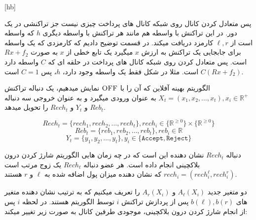 [hb]

پس متعادل کردن کانال روی شبکه کانال های پرداخت چیزی نیست جز تراکنشی در یک دور. در این تراکنش با واسطه هم مانند هر تراکنش با واسطه دیگری $h$ که واسطه است از
$\ell , r$
کارمزد دریافت میکند. در قسمت  توضیح دادیم که کارمزدی که یک واسطه برای جابجایی یک تراکنش به ارزش $x$ میگیرد یک تابع خطی از $x$ به صورت
$Rx+f_2$
است. پس متعادل کردن روی شبکه کانال های پرداخت در حلقه ای که $C$ واسطه دارد
$C(Rx+f_2)$
است. مثلا در شکل  فقط یک واسطه وجود دارد، $h$، پس
$C=1$
است.






الگوریتم بهینه آفلاین که آن را با $\textsc{OFF}$ نمایش میدهیم، یک دنباله تراکنش $X_t=(x_1,x_2,\dots,x_t), x_i \in \mathbb{R}^+$ به عنوان ورودی میگیرد و به عنوان خروجی سه دنباله $Reb_t$ و  $Y_t$ و $Rech_t$ را تحویل میدهد. 

$$Rech_t=\{rech_1,rech_2,\dots,rech_t\}, rech_i \in  \{\mathbb{R}^{\geq 0}\} \times \{\mathbb{R}^{\geq 0}\}$$
$$Reb_t=\{reb_1,reb_2,\dots,reb_t\}, reb_i \in  \mathbb{R}$$
$$Y_t=\{y_1,y_2,\dots,y_t\}, y_i \in \{\texttt{Accept},\texttt{Reject}\}$$


دنباله $Rech_t$ نشان دهنده این است که در چه زمان هایی الگوریتم  \off شارژ کردن درون بلاکچینی انجام داده است. هر عضو دنباله $Rech_t$ یک زوج مرتب است 
$rech_i = (rech^{\ell}_i,rech^{r}_i)$
که نشان دهنده میزان پول اضافه شده به $\ell$ و $r$ هستند.

 دو متغیر جدید
 $A_{\ell}(X_i)$ و $A_{r}(X_i)$
را تعریف میکنیم که به ترتیب نشان دهنده متغیر های 
$b(\ell) , b(r)$
 پس از پردازش تراکنش $i$ توسط الگوریتم \off هستند.
در لحظه $i$ پس از انجام شارژ کردن درون بلاکچینی، موجودی طرفین کانال به صورت زیر تغییر میکند:


